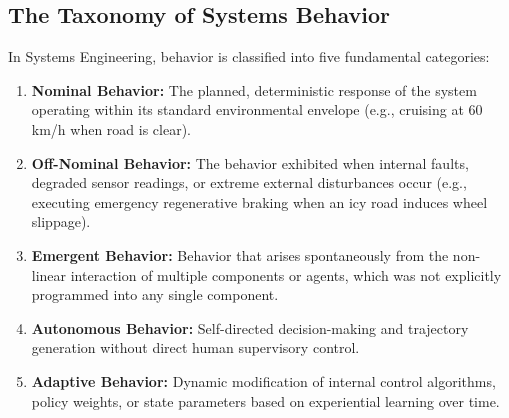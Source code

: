 \subsection{The Taxonomy of Systems Behavior}
In Systems Engineering, behavior is classified into five fundamental categories:
\begin{enumerate}[leftmargin=2em]
    \item \textbf{Nominal Behavior:} The planned, deterministic response of the system operating within its standard environmental envelope (e.g., cruising at 60 km/h when road is clear).
    \item \textbf{Off-Nominal Behavior:} The behavior exhibited when internal faults, degraded sensor readings, or extreme external disturbances occur (e.g., executing emergency regenerative braking when an icy road induces wheel slippage).
    \item \textbf{Emergent Behavior:} Behavior that arises spontaneously from the non-linear interaction of multiple components or agents, which was not explicitly programmed into any single component.
    \item \textbf{Autonomous Behavior:} Self-directed decision-making and trajectory generation without direct human supervisory control.
    \item \textbf{Adaptive Behavior:} Dynamic modification of internal control algorithms, policy weights, or state parameters based on experiential learning over time.
\end{enumerate}


